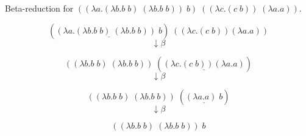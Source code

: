 \documentclass{article}
\begin{document}
{\centering
  Beta-reduction for $((\lambda a.(\lambda b.b\;b)\;(\lambda b.b\;b))\;b)\;((\lambda c.(c\;b))\;(\lambda a.a))$.\par
}

$$(\underline{(\lambda a.(\lambda b.b\;b)\;(\lambda b.b\;b))\;b})\;((\lambda c.(c\;b)) (\lambda a.a))$$
$$\downarrow{\beta}$$

$$((\lambda b.b\;b)\;(\lambda b.b\;b))\;(\underline{(\lambda c.(c\;b)) (\lambda a.a)})$$
$$\downarrow{\beta}$$

$$((\lambda b.b\;b)\;(\lambda b.b\;b))\;(\underline{(\lambda a.a)\;b})$$
$$\downarrow{\beta}$$

$$((\lambda b.b\;b)\;(\lambda b.b\;b))\;b$$
\end{document}

